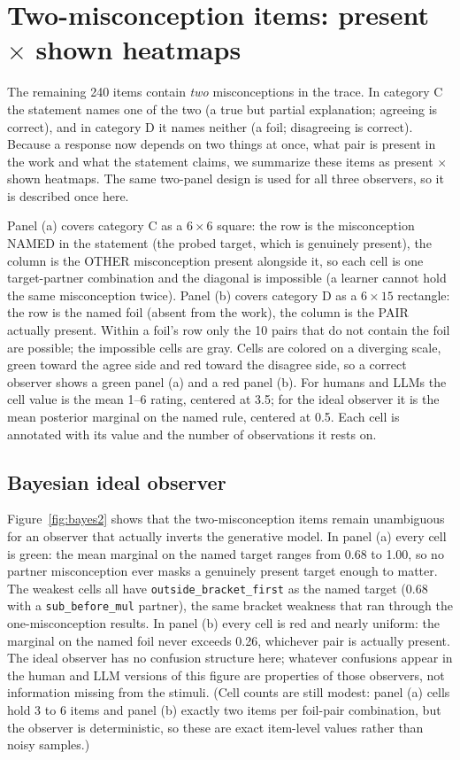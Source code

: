 \documentclass[11pt]{article}
\begin{document}
\section{Two-misconception items: present $\times$ shown heatmaps}\label{sec:2misc}

The remaining 240 items contain \emph{two} misconceptions in the trace. In category C the
statement names one of the two (a true but partial explanation; agreeing is correct), and in
category D it names neither (a foil; disagreeing is correct). Because a response now depends
on two things at once, what pair is present in the work and what the statement claims, we
summarize these items as present $\times$ shown heatmaps. The same two-panel design is used
for all three observers, so it is described once here.

Panel (a) covers category C as a $6 \times 6$ square: the row is the misconception NAMED in
the statement (the probed target, which is genuinely present), the column is the OTHER
misconception present alongside it, so each cell is one target-partner combination and the
diagonal is impossible (a learner cannot hold the same misconception twice). Panel (b) covers
category D as a $6 \times 15$ rectangle: the row is the named foil (absent from the work), the
column is the PAIR actually present. Within a foil's row only the 10 pairs that do not contain
the foil are possible; the impossible cells are gray. Cells are colored on a diverging scale,
green toward the agree side and red toward the disagree side, so a correct observer shows a
green panel (a) and a red panel (b). For humans and LLMs the cell value is the mean 1--6
rating, centered at 3.5; for the ideal observer it is the mean posterior marginal on the named
rule, centered at 0.5. Each cell is annotated with its value and the number of observations it
rests on.

\subsection{Bayesian ideal observer}\label{sec:bayes-2misc}

Figure~\ref{fig:bayes2} shows that the two-misconception items remain unambiguous for an
observer that actually inverts the generative model. In panel (a) every cell is green: the
mean marginal on the named target ranges from 0.68 to 1.00, so no partner misconception ever
masks a genuinely present target enough to matter. The weakest cells all have
\texttt{outside\_bracket\_first} as the named target (0.68 with a \texttt{sub\_before\_mul}
partner), the same bracket weakness that ran through the one-misconception results. In panel
(b) every cell is red and nearly uniform: the marginal on the named foil never exceeds 0.26,
whichever pair is actually present. The ideal observer has no confusion structure here;
whatever confusions appear in the human and LLM versions of this figure are properties of those
observers, not information missing from the stimuli. (Cell counts are still modest: panel (a)
cells hold 3 to 6 items and panel (b) exactly two items per foil-pair combination, but the
observer is deterministic, so these are exact item-level values rather than noisy samples.)
\end{document}
